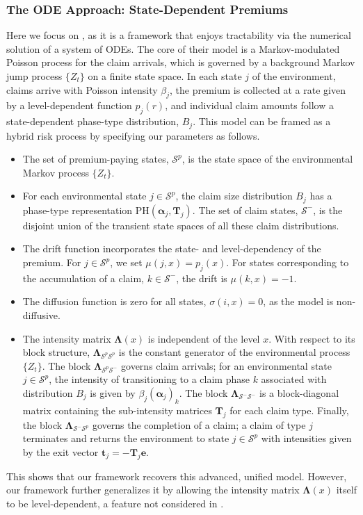 \documentclass[11pt]{article}
\numberwithin{table}{section}
\numberwithin{figure}{section}
\numberwithin{equation}{section}
\newcommand{\1}{{\mathbf 1}}
\newcommand{\0}{\mat{0}}
\begin{document}
\subsubsection*{The ODE Approach: State-Dependent Premiums}

Here we focus on \cite{asmussen1996phase}, as it is a framework that enjoys {tractability} via the numerical solution of a system of ODEs. The core of their model is a Markov-modulated Poisson process for the claim arrivals, which is governed by a background Markov jump process \(\{Z_t\}\) on a finite state space. In each state \(j\) of the environment, claims arrive with Poisson intensity \(\beta_j\), the premium is collected at a rate given by a level-dependent function \(p_j(r)\), and individual claim amounts follow a state-dependent phase-type distribution, \(B_j\). This model can be framed as a hybrid risk process by specifying our parameters as follows.
\begin{itemize}
    \item The set of premium-paying states, \(\mathcal{S}^p\), is the state space of the environmental Markov process \(\{Z_t\}\).
    \item For each environmental state \(j \in \mathcal{S}^p\), the claim size distribution \(B_j\) has a phase-type representation \(\mbox{PH}(\bm{\alpha}_j, \bm{T}_j)\). The set of claim states, \(\mathcal{S}^-\), is the disjoint union of the transient state spaces of all these claim distributions.
    \item The drift function incorporates the state- and level-dependency of the premium. For \(j \in \mathcal{S}^p\), we set \(\mu(j,x) = p_j(x)\). For states corresponding to the accumulation of a claim, \(k \in \mathcal{S}^-\), the drift is \(\mu(k,x) = -1\).
    \item The diffusion function is zero for all states, \(\sigma(i,x) = 0\), as the model is non-diffusive.
    \item The intensity matrix \(\bm{\Lambda}(x)\) is independent of the level \(x\). With respect to its block structure, \(\bm{\Lambda}_{\mathcal{S}^p\mathcal{S}^p}\) is the constant generator of the environmental process \(\{Z_t\}\). The block \(\bm{\Lambda}_{\mathcal{S}^p\mathcal{S}^-}\) governs claim arrivals; for an environmental state \(j \in \mathcal{S}^p\), the intensity of transitioning to a claim phase \(k\) associated with distribution \(B_j\) is given by \(\beta_j(\bm{\alpha}_j)_k\). The block \(\bm{\Lambda}_{\mathcal{S}^-\mathcal{S}^-}\) is a block-diagonal matrix containing the sub-intensity matrices \(\bm{T}_j\) for each claim type. Finally, the block \(\bm{\Lambda}_{\mathcal{S}^-\mathcal{S}^p}\) governs the completion of a claim; a claim of type \(j\) terminates and returns the environment to state \(j \in \mathcal{S}^p\) with intensities given by the exit vector \(\bm{t}_j = -\bm{T}_j\bm{e}\).
\end{itemize}
This shows that our framework recovers this advanced, unified model. However, our framework further generalizes it by allowing the intensity matrix \(\bm{\Lambda}(x)\) itself to be level-dependent, a feature not considered in \cite{asmussen1996phase}.
\end{document}
